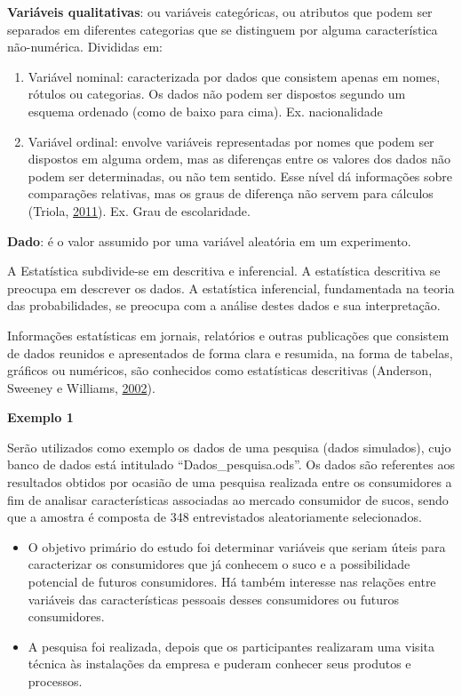 \documentclass[12pt,brazil,oneside]{book}
\begin{document}
\textbf{Variáveis qualitativas}: ou variáveis categóricas, ou atributos que podem ser separados em diferentes categorias que se distinguem por alguma característica não-numérica. Divididas em:

\begin{enumerate}
\def\labelenumi{\alph{enumi})}
\item
  Variável nominal: caracterizada por dados que consistem apenas em nomes, rótulos ou categorias. Os dados não podem ser dispostos segundo um esquema ordenado (como de baixo para cima). Ex. nacionalidade
\item
  Variável ordinal: envolve variáveis representadas por nomes que podem ser dispostos em alguma ordem, mas as diferenças entre os valores dos dados não podem ser determinadas, ou não tem sentido. Esse nível dá informações sobre comparações relativas, mas os graus de diferença não servem para cálculos (Triola, \protect\hyperlink{ref-triola1999}{2011}). Ex. Grau de escolaridade.
\end{enumerate}

\textbf{Dado}: é o valor assumido por uma variável aleatória em um experimento.

A Estatística subdivide-se em descritiva e inferencial. A estatística descritiva se preocupa em descrever os dados. A estatística inferencial, fundamentada na teoria das probabilidades, se preocupa com a análise destes dados e sua interpretação.

Informações estatísticas em jornais, relatórios e outras publicações que consistem de dados reunidos e apresentados de forma clara e resumida, na forma de tabelas, gráficos ou numéricos, são conhecidos como estatísticas descritivas (Anderson, Sweeney e Williams, \protect\hyperlink{ref-anderson2002}{2002}).

\textbf{Exemplo 1}

Serão utilizados como exemplo os dados de uma pesquisa (dados simulados), cujo banco de dados está intitulado ``Dados\_pesquisa.ods''. Os dados são referentes aos resultados obtidos por ocasião de uma pesquisa realizada entre os consumidores a fim de analisar características associadas ao mercado consumidor de sucos, sendo que a amostra é composta de 348 entrevistados aleatoriamente selecionados.

\begin{itemize}
\item
  O objetivo primário do estudo foi determinar variáveis que seriam úteis para caracterizar os consumidores que já conhecem o suco e a possibilidade potencial de futuros consumidores. Há também interesse nas relações entre variáveis das características pessoais desses consumidores ou futuros consumidores.
\item
  A pesquisa foi realizada, depois que os participantes realizaram uma visita técnica às instalações da empresa e puderam conhecer seus produtos e processos.
\end{itemize}
\end{document}
